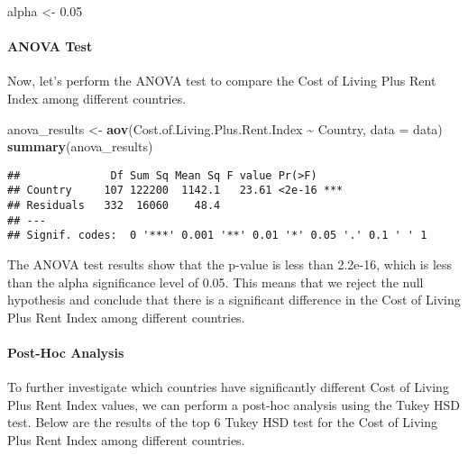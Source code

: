\documentclass[
]{article}
\newenvironment{Shaded}{\begin{snugshade}}{\end{snugshade}}
\newcommand{\AttributeTok}[1]{\textcolor[rgb]{0.13,0.29,0.53}{#1}}
\newcommand{\FloatTok}[1]{\textcolor[rgb]{0.00,0.00,0.81}{#1}}
\newcommand{\FunctionTok}[1]{\textcolor[rgb]{0.13,0.29,0.53}{\textbf{#1}}}
\newcommand{\NormalTok}[1]{#1}
\newcommand{\OtherTok}[1]{\textcolor[rgb]{0.56,0.35,0.01}{#1}}
\newcommand{\SpecialCharTok}[1]{\textcolor[rgb]{0.81,0.36,0.00}{\textbf{#1}}}
\begin{document}
\begin{Shaded}
\begin{Highlighting}[]
\NormalTok{alpha }\OtherTok{\textless{}{-}} \FloatTok{0.05}
\end{Highlighting}
\end{Shaded}

\paragraph{ANOVA Test}\label{anova-test}

Now, let's perform the ANOVA test to compare the Cost of Living Plus
Rent Index among different countries.

\begin{Shaded}
\begin{Highlighting}[]
\NormalTok{anova\_results }\OtherTok{\textless{}{-}} \FunctionTok{aov}\NormalTok{(Cost.of.Living.Plus.Rent.Index }\SpecialCharTok{\textasciitilde{}}\NormalTok{ Country, }\AttributeTok{data =}\NormalTok{ data)}
\FunctionTok{summary}\NormalTok{(anova\_results)}
\end{Highlighting}
\end{Shaded}

\begin{verbatim}
##              Df Sum Sq Mean Sq F value Pr(>F)    
## Country     107 122200  1142.1   23.61 <2e-16 ***
## Residuals   332  16060    48.4                   
## ---
## Signif. codes:  0 '***' 0.001 '**' 0.01 '*' 0.05 '.' 0.1 ' ' 1
\end{verbatim}

The ANOVA test results show that the p-value is less than 2.2e-16, which
is less than the alpha significance level of 0.05. This means that we
reject the null hypothesis and conclude that there is a significant
difference in the Cost of Living Plus Rent Index among different
countries.

\paragraph{Post-Hoc Analysis}\label{post-hoc-analysis}

To further investigate which countries have significantly different Cost
of Living Plus Rent Index values, we can perform a post-hoc analysis
using the Tukey HSD test. Below are the results of the top 6 Tukey HSD
test for the Cost of Living Plus Rent Index among different countries.

\begin{Shaded}
\end{Shaded}
\end{document}
